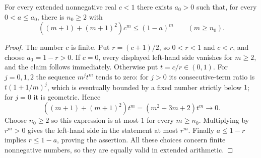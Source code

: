 \begin{lemma}
For every extended nonnegative real $c<1$ there exists $a_0>0$ such
that, for every $0<a\leq a_0$, there is $n_0\geq2$ with
\[
 ((m+1)+(m+1)^2)c^m\leq(1-a)^m\qquad(m\geq n_0).
\]
\end{lemma}
\begin{proof}
The number $c$ is finite. Put $r=(c+1)/2$, so $0<r<1$ and $c<r$,
and choose $a_0=1-r>0$. If $c=0$, every displayed left-hand side
vanishes for $m\geq2$, and the claim follows immediately.
Otherwise put $t=c/r\in(0,1)$. For $j=0,1,2$ the sequence $m^jt^m$
tends to zero: for $j>0$ its consecutive-term ratio is
$t(1+1/m)^j$, which is eventually bounded by a fixed number strictly
below $1$; for $j=0$ it is geometric. Hence
\[
 ((m+1)+(m+1)^2)t^m=(m^2+3m+2)t^m\longrightarrow0.
\]
Choose $n_0\geq2$ so this expression is at most $1$ for every
$m\geq n_0$. Multiplying by $r^m>0$ gives the left-hand side in
the statement at most $r^m$. Finally $a\leq1-r$ implies
$r\leq1-a$, proving the assertion. All these choices concern finite
nonnegative numbers, so they are equally valid in extended arithmetic.
\end{proof}
